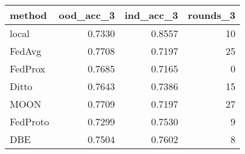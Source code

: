 \begin{tabular}{lrrr}
\toprule
method & ood_acc_3 & ind_acc_3 & rounds_3 \\
\midrule
local & 0.7330 & 0.8557 & 10 \\
FedAvg & 0.7708 & 0.7197 & 25 \\
FedProx & 0.7685 & 0.7165 & 0 \\
Ditto & 0.7643 & 0.7386 & 15 \\
MOON & 0.7709 & 0.7197 & 27 \\
FedProto & 0.7299 & 0.7530 & 9 \\
DBE & 0.7504 & 0.7602 & 8 \\
\bottomrule
\end{tabular}
